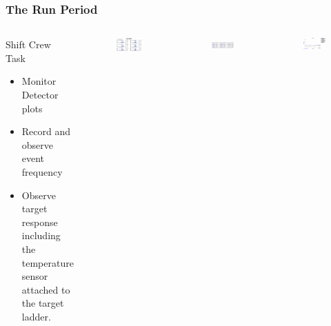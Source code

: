 \documentclass{beamer}
\begin{document}

\begin{frame}
\frametitle{The Run Period}
	\begin{columns}[c]
	\begin{block}{Shift Crew Task}
		\begin{itemize}
			\item Monitor Detector plots 
			\item Record and observe event frequency
			\item Observe target response including the temperature sensor attached to the target ladder.
		\end{itemize}
	\end{block}


	\vspace{-40pt}
	\begin{figure}
		\includegraphics[width=6cm]{../images/OnlineGui}
	\end{figure}
	\vspace{-20pt}
	\begin{figure}
		\includegraphics[width=5cm]{../images/scaler}
	\end{figure}
	\vspace{-20pt}
	\begin{figure}
		\includegraphics[width=5cm]{../images/lattertmps_g}
	\end{figure}
	
\end{columns}
\end{frame}
\end{document}
